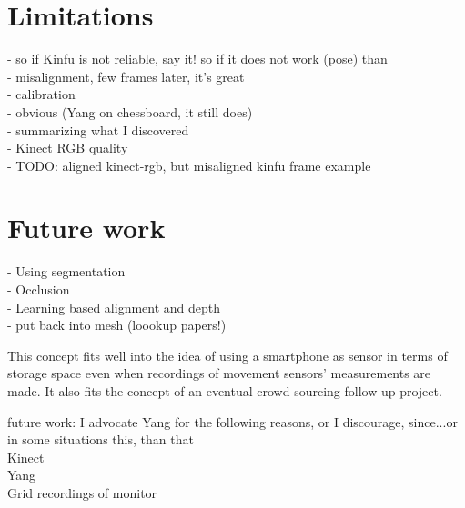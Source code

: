 \documentclass{ucl_thesis}
\begin{document}
\section{Limitations} 
\label{sec:limitations}
	- so if Kinfu is not reliable, say it! so if it does not work (pose) than \citep{Whelan13icra} \\
	- misalignment, few frames later, it's great \\
	- calibration \\
    - obvious (Yang on chessboard, it still does) \\
    - summarizing what I discovered \\
    - Kinect RGB quality \\
    - TODO: aligned kinect-rgb, but misaligned kinfu frame example
    
\section{Future work}
- Using segmentation \citep{Silberman:ECCV12} \\
- Occlusion \citep{Hoiem:2011} \\
- Learning based alignment and depth \citep{Herrera:LearnedJointMRF} \\
- put back into mesh (loookup papers!)

This concept fits well into the idea of using a smartphone as sensor in terms of storage space even when recordings of movement sensors' measurements are made. It also fits the concept of an eventual crowd sourcing follow-up project. 

future work: I advocate Yang for the following reasons, or I discourage, since...or in some situations this, than that \\
Kinect \\
Yang \\
Grid recordings of monitor\\
\end{document}
